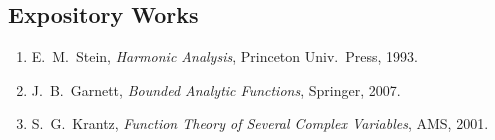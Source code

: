 \subsection*{Expository Works}
\begin{enumerate}
    \item E.\ M.\ Stein, \textit{Harmonic Analysis}, Princeton Univ.\ Press, 1993.
    \item J.\ B.\ Garnett, \textit{Bounded Analytic Functions}, Springer, 2007.
    \item S.\ G.\ Krantz, \textit{Function Theory of Several Complex Variables}, AMS, 2001.
\end{enumerate}


